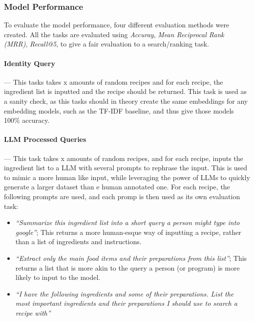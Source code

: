 \documentclass[11pt]{article}
\begin{document}
\subsubsection{Model Performance}\label{sec:modelperfomance}
To evaluate the model performance, four different evaluation methods were
created.
All the tasks are evaluated using \emph{Accuray},
\emph{Mean Reciprocal Rank (MRR)}, \emph{Recall@5}, to give a fair evaluation to
a search/ranking task.

\paragraph{Identity Query} --- This tasks takes x amounts of random recipes
and for each recipe, the ingredient list is inputted and the recipe should be
returned.
This task is used as a sanity check, as this tasks should in theory create the
same embeddings for any embedding models, such as the TF-IDF baseline, and thus
give those models 100\% accuracy.

\paragraph{LLM Processed Queries} --- This task takes x amounts of random
recipes, and for each recipe, inputs the ingredient list to a LLM with several
prompts to rephrase the input.
This is used to mimic a more human like input, while leveraging the power of
LLMs to quickly generate a larger dataset than e human annotated one.
For each recipe, the following prompts are used, and each promp is then used as
its own evaluation task:
\begin{itemize}
    \item \emph{``Summarize this ingredient list into a short query a person might type
        into google''}; This returns a more human-esque way of inputting a
        recipe, rather than a list of ingredients and instructions.
    \item \emph{``Extract only the main food items and their preparations from
        this list''}; This returns a list that is more akin to the query a
        person (or program) is more likely to input to the model.
    \item \emph{``I have the following ingredients and some of their
            preparations. List the most important ingredients and their
        preparations I should use to search a recipe with''}
\end{itemize}
\end{document}
